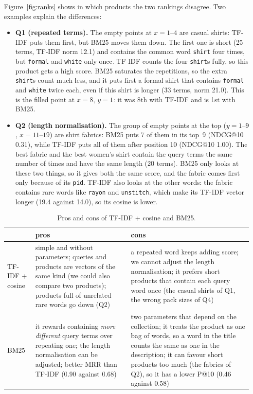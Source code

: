 \documentclass[11pt,a4paper]{article}
\begin{document}
Figure~\ref{fig:ranks} shows in which products the two rankings disagree. Two examples explain the differences:
\begin{itemize}
\item \textbf{Q1 (repeated terms).} The empty points at $x = 1$--$4$ are casual shirts: TF-IDF puts them first, but
BM25 moves them down. The first one is short (25 terms, TF-IDF norm 12.1) and contains the common word \texttt{shirt}
four times, but \texttt{formal} and \texttt{white} only once. TF-IDF counts the four \texttt{shirt}s fully, so this
product gets a high score. BM25 saturates the repetitions, so the extra \texttt{shirt}s count much less, and it puts
first a formal shirt that contains \texttt{formal} and \texttt{white} twice each, even if this shirt is longer (33
terms, norm 21.0). This is the filled point at $x = 8$, $y = 1$: it was 8th with TF-IDF and is 1st with BM25.
\item \textbf{Q2 (length normalisation).} The group of empty points at the top ($y = 1$--$9$, $x = 11$--$19$) are
shirt fabrics: BM25 puts 7 of them in its top~9 (NDCG@10 0.31), while TF-IDF puts all of them after position 10
(NDCG@10 1.00). The best fabric and the best women's shirt contain the query terms the same number of times and have
the same length (20 terms). BM25 only looks at these two things, so it gives both the same score, and the fabric comes first only
because of its \texttt{pid}. TF-IDF also looks at
the other words: the fabric contains rare words like \texttt{rayon} and \texttt{unstitch}, which make its TF-IDF vector
longer (19.4 against 14.0), so its cosine is lower.
\end{itemize}

\begin{table}[H]
\centering\small
\caption{Pros and cons of TF-IDF + cosine and BM25.}
\begin{tabularx}{\textwidth}{@{}lYY@{}}
\toprule
 & pros & cons\\
\midrule
TF-IDF + cosine & simple and without parameters; queries and products are vectors of the same kind (we could also
compare two products); products full of unrelated rare words go down (Q2) & a repeated word keeps adding score; we
cannot adjust the length normalisation; it prefers short products that contain each query word once (the casual shirts
of Q1, the wrong pack sizes of Q4)\\
BM25 & it rewards containing \emph{more different} query terms over repeating one; the length normalisation can be
adjusted; better MRR than TF-IDF (0.90 against 0.68) & two parameters
that depend on the collection; it treats the product as one bag of words, so a word in the title counts the same as
one in the description; it can favour short products too much (the fabrics of Q2), so it has a lower P@10 (0.46
against 0.58)\\
\bottomrule
\end{tabularx}
\end{table}
\end{document}
